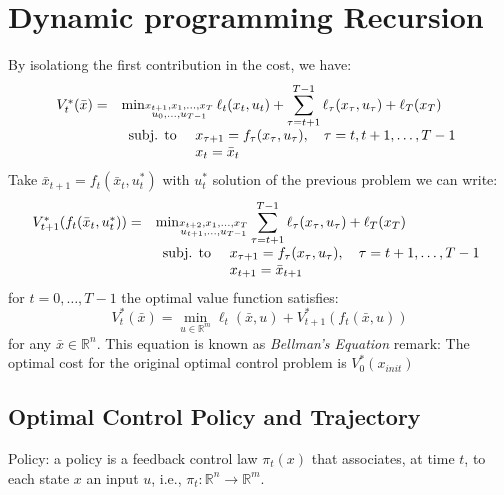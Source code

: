 \documentclass{book}
\newcommand{\R}{\mathbb{R}}
\theoremstyle{definition}
\theoremstyle{remark}
\theoremstyle{remark}
\begin{document}
\section{Dynamic programming Recursion}
By isolationg the first contribution in the cost, we have: 
\begin{gather*}
    \begin{array}{r l}
        V_t^*(\bar{x})= & \min_{\substack{x_{t+1},x_1,\dots,x_T\\u_0,\dots,u_{T-1}}} \ell_t(x_t,u_t) + \displaystyle\sum_{\tau=t+1}^{T-1}\ell_\tau(x_\tau,u_\tau)+\ell_T(x_T)\\
                        & \begin{array}{l l }
                            \text{subj. to } & x_{\tau+1}=f_\tau(x_\tau,u_\tau), \quad \tau=t,t+1,\dots,T-1\\
                                             & x_t = \bar{x}_t
                        \end{array}
    \end{array}
\end{gather*}
Take $\bar{x}_{t+1} = f_t(\bar{x}_t,u_t^*)$ with $u_t^*$ solution of the previous problem we can write: 
\begin{gather*}
    \begin{array}{r l}
        V_{t+1}^*(f_t(\bar{x}_t,u_t^*))= & \min_{\substack{x_{t+2},x_1,\dots,x_T\\u_{t+1},\dots,u_{T-1}}}  \displaystyle\sum_{\tau=t+1}^{T-1}\ell_\tau(x_\tau,u_\tau)+\ell_T(x_T)\\
                        & \begin{array}{l l }
                            \text{subj. to } & x_{\tau+1}=f_\tau(x_\tau,u_\tau), \quad \tau=t+1,\dots,T-1\\
                                             & x_{t+1} = \bar{x}_{t+1}
                        \end{array}
    \end{array}
\end{gather*}
for $t=0,\dots,T-1$ the optimal value function satisfies: 
\[
    V_t^*(\bar{x})=\min_{u\in\R^m}\ell_t(\bar{x},u)+V_{t+1}^*(f_t(\bar{x},u))
\]
for any $\bar{x}\in\R^n$. This equation is known as \emph{Bellman's Equation}
remark: The optimal cost for the original optimal control problem is $V_0^*(x_{init})$

\subsection{Optimal Control Policy and Trajectory}
Policy: a policy is a feedback control law $\pi_t(x)$ that associates, at time $t$, to each state $x$ an input $u$, i.e., $\pi_t:\R^n\to\R^m$.
\end{document}

